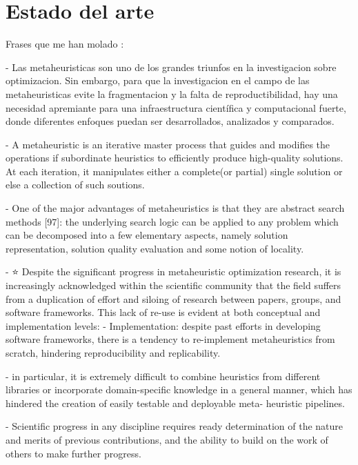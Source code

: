 \chapter{Estado del arte}

Frases que me han molado
\cite{arXiv:2011.09821} :

- Las metaheuristicas son uno de los grandes triunfos en la investigacion sobre optimizacion. Sin embargo, para que la investigacion
en el campo de las metaheuristicas evite la fragmentacion y la falta de reproductibilidad, hay una necesidad apremiante para
una infraestructura científica y computacional fuerte, donde diferentes enfoques puedan ser desarrollados, analizados y
comparados.

- A metaheuristic is an iterative master process that guides and modifies the operations if subordinate heuristics to
efficiently produce high-quality solutions. At each iteration, it manipulates either a complete(or partial) single solution
or else a collection of such soutions.

- One of the major advantages of metaheuristics is that they are abstract search methods [97]: the underlying search logic can be
applied to any problem which can be decomposed into a few elementary aspects, namely solution representation,
solution quality evaluation and some notion of locality.

- ⭐ Despite the significant progress in metaheuristic optimization research, it is increasingly acknowledged within
the scientific community that the field suffers from a duplication of effort and siloing of research between papers,
groups, and software frameworks. This lack of re-use is evident at both conceptual and implementation levels:
 - Implementation: despite past efforts in developing software frameworks, there is a tendency to re-implement
metaheuristics from scratch, hindering reproducibility and replicability.

-  in particular, it is extremely difficult to combine heuristics from different libraries or incorporate domain-specific
knowledge in a general manner, which has hindered the creation of easily testable and deployable meta- heuristic pipelines.

- Scientific progress in any discipline requires ready determination of the nature and merits of previous contributions,
and the ability to build on the work of others to make further progress.